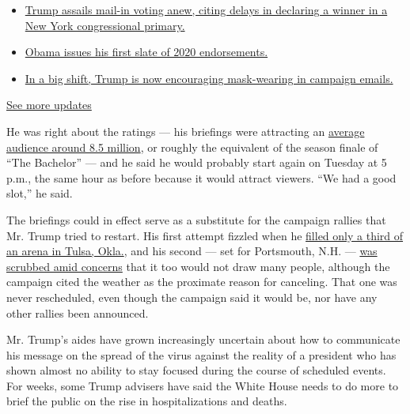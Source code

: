 \begin{itemize}
\tightlist
\item
  \href{https://www.nytimes.com/2020/08/03/us/elections/biden-vs-trump.html?action=click\&pgtype=Article\&state=default\&region=MAIN_CONTENT_1\&context=storylines_live_updates\#link-6494b448}{Trump
  assails mail-in voting anew, citing delays in declaring a winner in a
  New York congressional primary.}
\item
  \href{https://www.nytimes.com/2020/08/03/us/elections/biden-vs-trump.html?action=click\&pgtype=Article\&state=default\&region=MAIN_CONTENT_1\&context=storylines_live_updates\#link-3de249e6}{Obama
  issues his first slate of 2020 endorsements.}
\item
  \href{https://www.nytimes.com/2020/08/03/us/elections/biden-vs-trump.html?action=click\&pgtype=Article\&state=default\&region=MAIN_CONTENT_1\&context=storylines_live_updates\#link-54e34d20}{In
  a big shift, Trump is now encouraging mask-wearing in campaign
  emails.}
\end{itemize}

\href{https://www.nytimes.com/2020/08/03/us/elections/biden-vs-trump.html?action=click\&pgtype=Article\&state=default\&region=MAIN_CONTENT_1\&context=storylines_live_updates}{See
more updates}

He was right about the ratings --- his briefings were attracting an
\href{https://www.nytimes.com/2020/03/25/business/media/trump-coronavirus-briefings-ratings.html}{average
audience around 8.5 million}, or roughly the equivalent of the season
finale of ``The Bachelor'' --- and he said he would probably start again
on Tuesday at 5 p.m., the same hour as before because it would attract
viewers. ``We had a good slot,'' he said.

The briefings could in effect serve as a substitute for the campaign
rallies that Mr. Trump tried to restart. His first attempt fizzled when
he
\href{https://www.nytimes.com/2020/06/20/us/politics/tulsa-trump-rally.html}{filled
only a third of an arena in Tulsa, Okla.}, and his second --- set for
Portsmouth, N.H. ---
\href{https://www.nytimes.com/2020/07/10/us/politics/trump-nh-rally-postponed.html}{was
scrubbed amid concerns} that it too would not draw many people, although
the campaign cited the weather as the proximate reason for canceling.
That one was never rescheduled, even though the campaign said it would
be, nor have any other rallies been announced.

Mr. Trump's aides have grown increasingly uncertain about how to
communicate his message on the spread of the virus against the reality
of a president who has shown almost no ability to stay focused during
the course of scheduled events. For weeks, some Trump advisers have said
the White House needs to do more to brief the public on the rise in
hospitalizations and deaths.

